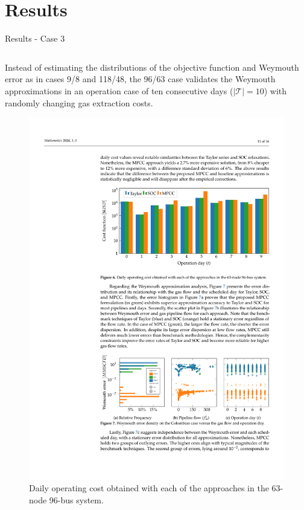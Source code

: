 \documentclass[hyperref={colorlinks,citecolor=blue,linkcolor=blue,urlcolor=blue}]{beamer}
\newlength\figureheight
\newlength\figurewidth
\begin{document}
\section{Results}
\begin{frame}{Results - Case 3}
\scriptsize
\begin{columns}[t,onlytextwidth]
    \begin{column}{0.48\textwidth}
        Instead of estimating the distributions of the objective function and Weymouth error as in cases 9/8 and 118/48, the 96/63 case validates the Weymouth approximations in an operation case of ten consecutive days ($\left | \mathcal{T} \right | = 10 $) with randomly changing gas extraction costs.
                
        \begin{figure}[H]
            \centering
            \setlength{}        
            \setlength{}
            \includegraphics[width=\figurewidth, height=\figureheight]{figures/case3_cost.pdf} 
            \caption{\scriptsize Daily operating cost obtained with each of the approaches in the 63-node 96-bus system.}
            \label{fig:red_test_cost}
        \end{figure}
    \end{column}
    

\end{columns}
\end{frame}
\end{document}
